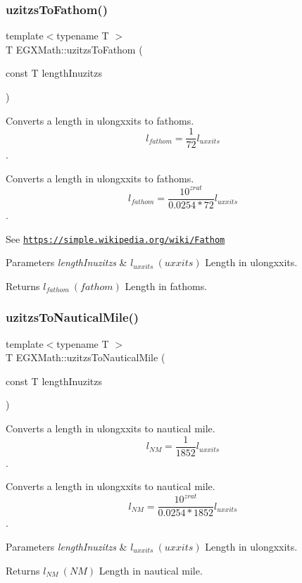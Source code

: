 \subsubsection{\texorpdfstring{uzitzs\+To\+Fathom()}{uzitzsToFathom()}}
{\footnotesize\ttfamily template$<$typename T $>$ \\
T E\+G\+X\+Math\+::uzitzs\+To\+Fathom (\begin{DoxyParamCaption}\item[{const T}]{length\+Inuzitzs }\end{DoxyParamCaption})}



Converts a length in ulongxxits to fathoms. \[ l_{fathom}= \frac{1}{72} l_{uxxits} \]. 

Converts a length in ulongxxits to fathoms. \[ l_{fathom}= \frac{10^{zrat}}{0.0254 * 72} l_{uxxits} \].

See \href{https://simple.wikipedia.org/wiki/Fathom}{\tt https\+://simple.\+wikipedia.\+org/wiki/\+Fathom} 
\begin{DoxyParams}{Parameters}
{\em length\+Inuzitzs} & $ l_{uxxits}\ (uxxits)$ Length in ulongxxits. \\
\hline
\end{DoxyParams}
\begin{DoxyReturn}{Returns}
$ l_{fathom}\ (fathom)$ Length in fathoms. 
\end{DoxyReturn}
\mbox{\label{group___e_g_x_math-_conversions-_length_conversions-uzitzs-_nautical_ga71c06fc85e22f77eba0b234edefa4562}} 
\subsubsection{\texorpdfstring{uzitzs\+To\+Nautical\+Mile()}{uzitzsToNauticalMile()}}
{\footnotesize\ttfamily template$<$typename T $>$ \\
T E\+G\+X\+Math\+::uzitzs\+To\+Nautical\+Mile (\begin{DoxyParamCaption}\item[{const T}]{length\+Inuzitzs }\end{DoxyParamCaption})}



Converts a length in ulongxxits to nautical mile. \[ l_{NM}= \frac{1}{1852} l_{uxxits} \]. 

Converts a length in ulongxxits to nautical mile. \[ l_{NM}= \frac{10^{zrat}}{0.0254 * 1852} l_{uxxits} \].


\begin{DoxyParams}{Parameters}
{\em length\+Inuzitzs} & $ l_{uxxits}\ (uxxits)$ Length in ulongxxits. \\
\hline
\end{DoxyParams}
\begin{DoxyReturn}{Returns}
$ l_{NM}\ (NM)$ Length in nautical mile. 
\end{DoxyReturn}
